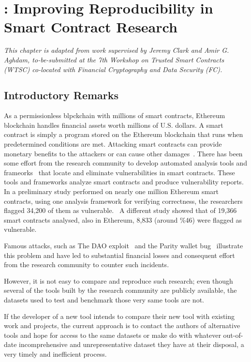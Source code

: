 \chapter{\etherbase: Improving Reproducibility in Smart Contract Research} \label{ch:etherbase}


\textit{
	This chapter is adapted from work supervised by Jeremy Clark and Amir G. Aghdam, to-be-submitted at the 7th Workshop on Trusted Smart Contracts (WTSC) co-located with Financial Cryptography and Data Security (FC).
}

\section{Introductory Remarks}
	\label{sec:intro}
	As a permissionless blpckchain with millions of smart contracts, Ethereum blockchain handles financial assets worth millions of U.S. dollars.
	A smart contract is simply a program stored on the Ethereum blockchain that runs when predetermined conditions are met.
	Attacking smart contracts can provide monetary benefits to the attackers or can cause other damages~\cite{A-Survey-of-Attacks-on-Ethereum-Smart-Contracts}.
	There has been some effort from the research community to develop automated analysis tools and frameorks~\cite{ref_tools} that locate and eliminate vulnerabilities in smart contracts.
	These tools and frameworks analyze smart contracts and produce vulnerability reports.
	In a preliminary study performed on nearly one million Ethereum smart contracts, using one analysis framework for verifying correctness, the researchers flagged 34,200 of them as vulnerable.~\cite{ref_flag1}
	A different study showed that of 19,366 smart contracts analysed, also in Ethereum, 8,833 (around \%46) were flagged as vulnerable.~\cite{ref_flag2}

	Famous attacks, such as The DAO exploit~\cite{dao} and the Parity wallet bug~\cite{ref_parity} illustrate this problem and have led to substantial financial losses and consequent effort from the research community to counter such incidents.

	However, it is not easy to compare and reproduce such research; even though several of the tools built by the research community are publicly available, the datasets used to test and benchmark those very same tools are not.

	If the developer of a new tool intends to compare their new tool with existing work and projects, the current approach is to contact the authors of alternative tools and hope for access to the same datasets or make do with whatever out-of-date incomprehensive and unrepresentative dataset they have at their disposal, a very timely and inefficient process.

